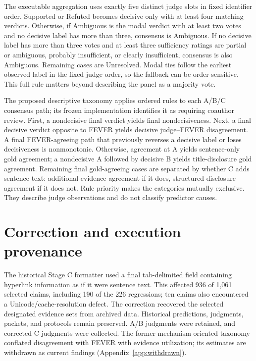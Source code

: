 \documentclass[11pt,letterpaper]{article}
\begin{document}
The executable aggregation uses exactly five distinct judge slots in fixed identifier order. Supported or Refuted becomes decisive only with at least four matching verdicts. Otherwise, if Ambiguous is the modal verdict with at least two votes and no decisive label has more than three, consensus is Ambiguous. If no decisive label has more than three votes and at least three sufficiency ratings are partial or ambiguous, probably insufficient, or clearly insufficient, consensus is also Ambiguous. Remaining cases are Unresolved. Modal ties follow the earliest observed label in the fixed judge order, so the fallback can be order-sensitive. This full rule matters beyond describing the panel as a majority vote.

The proposed descriptive taxonomy applies ordered rules to each A/B/C consensus path; its frozen implementation identifies it as requiring coauthor review. First, a nondecisive final verdict yields final nondecisiveness. Next, a final decisive verdict opposite to FEVER yields decisive judge--FEVER disagreement. A final FEVER-agreeing path that previously reverses a decisive label or loses decisiveness is nonmonotonic. Otherwise, agreement at A yields sentence-only gold agreement; a nondecisive A followed by decisive B yields title-disclosure gold agreement. Remaining final gold-agreeing cases are separated by whether C adds sentence text: additional-evidence agreement if it does, structured-disclosure agreement if it does not. Rule priority makes the categories mutually exclusive. They describe judge observations and do not classify predictor causes.

\section{Correction and execution provenance}\label{app:provenance}
The historical Stage C formatter used a final tab-delimited field containing hyperlink information as if it were sentence text. This affected 936 of 1,061 selected claims, including 190 of the 226 regressions; ten claims also encountered a Unicode/cache-resolution defect. The correction recovered the selected designated evidence sets from archived data. Historical predictions, judgments, packets, and protocols remain preserved. A/B judgments were retained, and corrected C judgments were collected. The former mechanism-oriented taxonomy conflated disagreement with FEVER with evidence utilization; its estimates are withdrawn as current findings (Appendix~\ref{app:withdrawn}).
\end{document}
